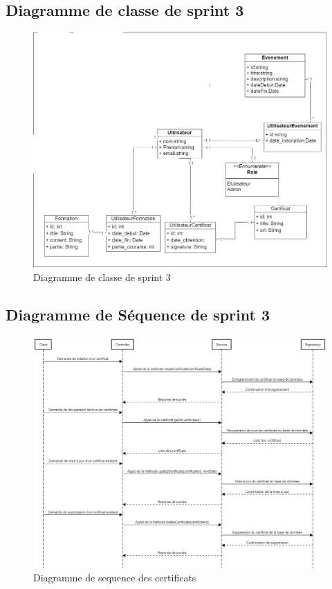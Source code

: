\documentclass[a4paper, 11pt, openany]{report}
\begin{document}
\subsection{Diagramme de classe de sprint 3}

\begin{figure}[H]
\centering
\includegraphics[width=\textwidth]{sprint2-class.png} 
\caption{Diagramme de classe de sprint 3}
\label{fig:s3_class}
\end{figure}

\subsection{Diagramme de Séquence de sprint 3}
\clearpage
\begin{figure}
\centering
\includegraphics[width=\textwidth]{seq-certifs.png} 
\caption{Diagramme de sequence des certificats}
\label{fig:seq_certifs}
\end{figure}
\end{document}
